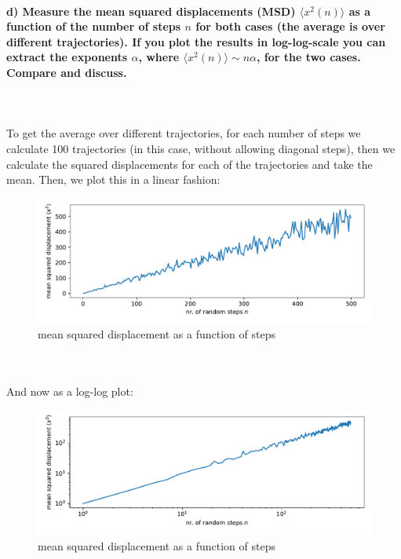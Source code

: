
\newpage
\paragraph{d) Measure the mean squared displacements (MSD) 
    $\langle x^2(n)\rangle$ as a function of the number of steps $n$ 
    for both cases (the average is over different trajectories). If you 
    plot the results in log-log-scale you can extract the exponents 
    $\alpha$, where $\langle x^2(n)\rangle\sim n\alpha$, for the two 
    cases. Compare and discuss.
} \ \\
\\
    To get the average over different trajectories, for each number of 
    steps we calculate 100 trajectories (in this case, without 
    allowing diagonal steps), then we calculate the squared 
    displacements for each of the trajectories and take the mean.
    Then, we plot this in a linear fashion: \\
    \begin{figure}[h!]
        \centering
        \includegraphics[width=\textwidth]{./figures/MSD_vs_N.pdf}
        \caption{mean squared displacement as a function of steps}
    \end{figure} \ \\
    \\
    And now as a log-log plot: \\
    \begin{figure}[h!]
        \centering
        \includegraphics[width=\textwidth]{./figures/MSD_vs_N_loglog.pdf}
        \caption{mean squared displacement as a function of steps}
    \end{figure} \ \\
    \\


